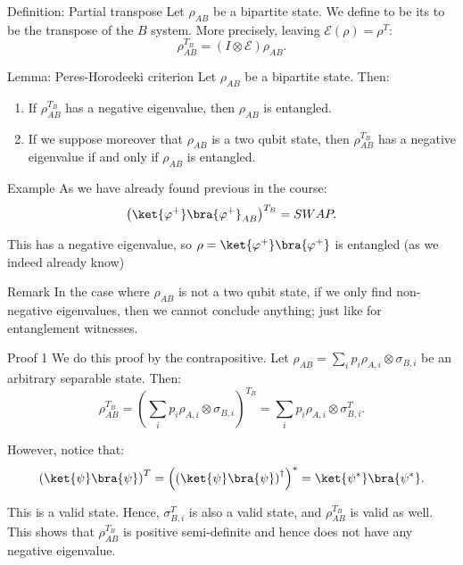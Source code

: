 \documentclass[a4paper]{article}
\begin{document}
\begin{parag}{Definition: Partial transpose}
    Let $\rho_{AB}$ be a bipartite state. We define to be its  to be the transpose of the $B$ system. More precisely, leaving $\mathcal{E}\left(\rho\right) = \rho^T$: 
    \[\rho_{AB}^{T_B} = \left(I \otimes \mathcal{E}\right) \rho_{AB}.\]
\end{parag}

\begin{parag}{Lemma: Peres-Horodeeki criterion}
    Let $\rho_{AB}$ be a bipartite state. Then:
    \begin{enumerate}
        \item If $\rho_{AB}^{T_B}$ has a negative eigenvalue, then $\rho_{AB}$ is entangled.
        \item If we suppose moreover that $\rho_{AB}$ is a two qubit state, then $\rho_{AB}^{T_B}$ has a negative eigenvalue if and only if $\rho_{AB}$ is entangled.
    \end{enumerate}

    \begin{subparag}{Example}
        As we have already found previous in the course: 
        \[\left(\ket{\phi^+}\bra{\phi^+}_{AB}\right)^{T_B} = SWAP.\]
        
        This has a negative eigenvalue, so $\rho = \ket{\phi^+}\bra{\phi^+}$ is entangled (as we indeed already know) 
    \end{subparag}

    \begin{subparag}{Remark}
        In the case where $\rho_{AB}$ is not a two qubit state, if we only find non-negative eigenvalues, then we cannot conclude anything; just like for entanglement witnesses.
    \end{subparag}
    
    \begin{subparag}{Proof 1}
        We do this proof by the contrapositive. Let $\rho_{AB} = \sum_{i} p_i \rho_{A, i} \otimes \sigma_{B, i}$ be an arbitrary separable state. Then:
        \[\rho_{AB}^{T_B} = \left(\sum_{i} p_i \rho_{A, i} \otimes \sigma_{B, i}\right)^{T_B} = \sum_{i} p_i \rho_{A, i} \otimes \sigma_{B, i}^T.\]

        However, notice that:
        \[\left(\ket{\psi}\bra{\psi}\right)^T = \left(\left(\ket{\psi}\bra{\psi}\right)^{\dagger}\right)^* = \ket{\psi^*}\bra{\psi^*}.\]

        This is a valid state. Hence, $\sigma_{B, i}^{T}$ is also a valid state, and $\rho_{AB}^{T_B}$ is valid as well. This shows that $\rho_{AB}^{T_B}$ is positive semi-definite and hence does not have any negative eigenvalue.
    \end{subparag}


\end{parag}
\end{document}
